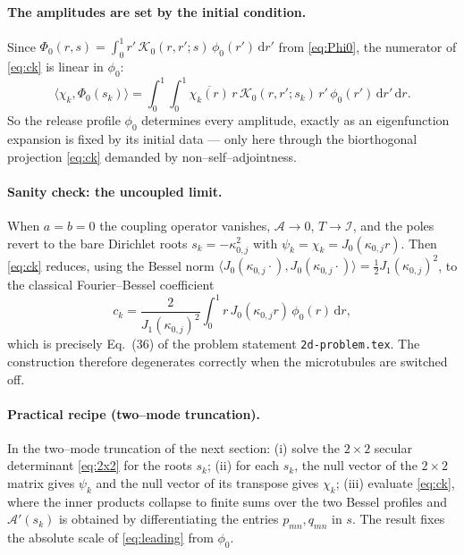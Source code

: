 \documentclass{article}
\newcommand{\rd}{\mathrm{d}}
\begin{document}
\paragraph{The amplitudes are set by the initial condition.} Since
$\Phi_0(r,s)=\int_0^1 r'\,\mathcal K_0(r,r';s)\,\phi_0(r')\,\rd r'$ from
\eqref{eq:Phi0}, the numerator of \eqref{eq:ck} is linear in $\phi_0$:
\begin{equation}
\langle\chi_k,\Phi_0(s_k)\rangle
=\int_0^1\!\!\int_0^1
\overline{\chi_k(r)}\,r\,\mathcal K_0(r,r';s_k)\,r'\,\phi_0(r')\,\rd r'\,\rd r .
\label{eq:ckdata}
\end{equation}
So the release profile $\phi_0$ determines every amplitude, exactly as an
eigenfunction expansion is fixed by its initial data --- only here through the
biorthogonal projection \eqref{eq:ck} demanded by non--self--adjointness.

\paragraph{Sanity check: the uncoupled limit.} When $a=b=0$ the coupling
operator vanishes, $\mathcal A\to0$, $T\to\mathcal I$, and the poles revert to the
bare Dirichlet roots $s_k=-\kappa_{0,j}^2$ with
$\psi_k=\chi_k=J_0(\kappa_{0,j}r)$. Then \eqref{eq:ck} reduces, using the Bessel
norm $\langle J_0(\kappa_{0,j}\cdot),J_0(\kappa_{0,j}\cdot)\rangle
=\tfrac12 J_1(\kappa_{0,j})^2$, to the classical Fourier--Bessel coefficient
\begin{equation}
c_k=\frac{2}{J_1(\kappa_{0,j})^2}\int_0^1 r\,J_0(\kappa_{0,j}r)\,\phi_0(r)\,\rd r,
\end{equation}
which is precisely Eq.~(36) of the problem statement \texttt{2d-problem.tex}.
The construction therefore degenerates correctly when the microtubules are
switched off.

\paragraph{Practical recipe (two--mode truncation).} In the two--mode truncation
of the next section:
(i) solve the $2\times2$ secular determinant \eqref{eq:2x2} for the roots $s_k$;
(ii) for each $s_k$, the null vector of the $2\times2$ matrix gives $\psi_k$ and
the null vector of its transpose gives $\chi_k$; (iii) evaluate \eqref{eq:ck},
where the inner products collapse to finite sums over the two Bessel profiles and
$\mathcal A'(s_k)$ is obtained by differentiating the entries
$p_{mn},q_{mn}$ in $s$. The result fixes the absolute scale of \eqref{eq:leading}
from $\phi_0$.
\end{document}
